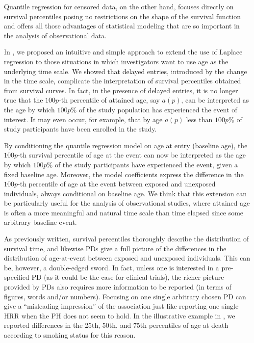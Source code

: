 Quantile regression for censored data, on the other hand, focuses directly on survival percentiles  posing no restrictions on the shape of the survival function and offers all those advantages of statistical modeling that are so important in the analysis of observational data.

In , we proposed an intuitive and simple approach to extend the use of Laplace regression to those situations in which investigators want to use age as the underlying time scale. We showed that delayed entries, introduced by the change in the time scale, complicate the interpretation of survival percentiles obtained from survival curves. In fact, in the presence of delayed entries, it is no longer true that the $100p$-th percentile of attained age, say $a(p)$, can be interpreted as the age by which $100p\%$ of the study population has experienced the event of interest. It may even occur, for example, that by age $a(p)$ less than $100p\%$ of study participants have been enrolled in the study.

By conditioning the quantile regression model on age at entry (baseline age), the $100p$-th survival percentile of age at the event can now be interpreted as the age by which $100p\%$ of the study participants have experienced the event, given a fixed baseline age. Moreover, the model coefficients express the difference in the $100p$-th percentile of age at the event between exposed and unexposed individuals, always conditional on baseline age. We think that this extension can be particularly useful for the analysis of observational studies, where attained age is often a more meaningful and natural time scale than time elapsed since some arbitrary baseline event. 

As previously written, survival percentiles thoroughly describe the distribution of survival time, and likewise PDs give a full picture of the differences in the distribution of age-at-event between exposed and unexposed individuals. This can be, however, a double-edged sword. In fact, unless one is interested in a pre-specified PD (as it could be the case for clinical trials), the richer picture provided by PDs also requires more information to be reported (in terms of figures, words and/or numbers). Focusing on  one single arbitrary chosen PD  can give a ``misleading impression'' of the association just like reporting one single HRR when the PH does not seem to hold. In the illustrative example in , we reported differences in the 25th, 50th, and 75th percentiles of age at death according to smoking status for this reason.

